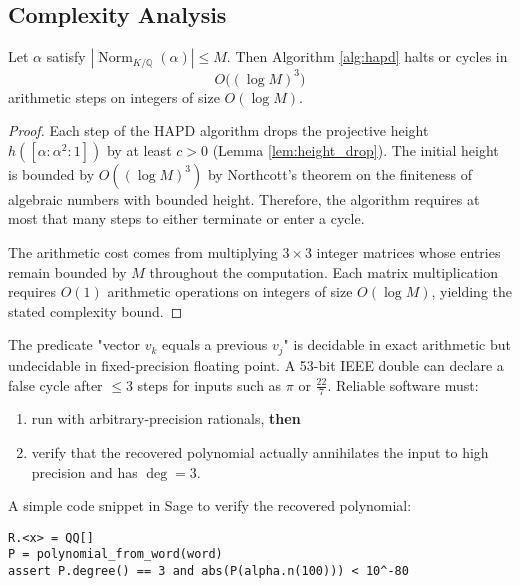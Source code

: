 \subsection{Complexity Analysis}

\begin{proposition}\label{prop:complexity_appendix}
Let $\alpha$ satisfy $|\operatorname{Norm}_{K/\mathbb{Q}}(\alpha)|\le M$.
Then Algorithm \ref{alg:hapd} halts or cycles in
\[
O\!\bigl( (\log M)^{3}\bigr)
\]
arithmetic steps on integers of size $O(\log M)$.
\end{proposition}

\begin{proof}
Each step of the HAPD algorithm drops the projective height $h([\alpha:\alpha^{2}:1])$ by at least $c > 0$ (Lemma \ref{lem:height_drop}). The initial height is bounded by $O((\log M)^{3})$ by Northcott's theorem on the finiteness of algebraic numbers with bounded height. Therefore, the algorithm requires at most that many steps to either terminate or enter a cycle.

The arithmetic cost comes from multiplying $3\times 3$ integer matrices whose entries remain bounded by $M$ throughout the computation. Each matrix multiplication requires $O(1)$ arithmetic operations on integers of size $O(\log M)$, yielding the stated complexity bound.
\end{proof}

\begin{remark}\label{rem:finite_precision}
The predicate "vector $v_{k}$ equals a previous $v_{j}$" is decidable in exact arithmetic but undecidable in fixed-precision floating point. A 53-bit IEEE double can declare a false cycle after $\leq 3$ steps for inputs such as $\pi$ or $\tfrac{22}{7}$. Reliable software must:
\begin{enumerate}[label=(\roman*)]
\item run with arbitrary-precision rationals, \textbf{then}
\item verify that the recovered polynomial actually annihilates the input to high precision and has $\deg=3$.
\end{enumerate}
\end{remark}

A simple code snippet in Sage to verify the recovered polynomial:
\begin{verbatim}
R.<x> = QQ[]
P = polynomial_from_word(word)
assert P.degree() == 3 and abs(P(alpha.n(100))) < 10^-80
\end{verbatim}

